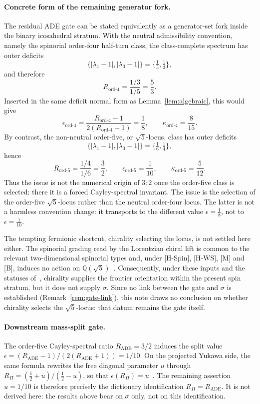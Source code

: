 \documentclass[11pt]{article}
\theoremstyle{definition}
\theoremstyle{remark}
\begin{document}
    \paragraph{Concrete form of the remaining generator fork.}
    The residual ADE gate can be stated equivalently as a generator-set fork inside the binary icosahedral stratum.
    With the neutral admissibility convention, namely the spinorial order-four half-turn class, the class-complete
    spectrum has outer deficits
    \[
      \{|\lambda_1-1|,|\lambda_3-1|\}=\{\tfrac15,\tfrac13\},
    \]
    and therefore
    \[
      R_{\mathrm{ord}\text{-}4}=\frac{1/3}{1/5}=\frac53.
    \]
    Inserted in the same deficit normal form as Lemma~\ref{lem:algebraic}, this would give
    \[
      \epsilon_{\mathrm{ord}\text{-}4}=\frac{R_{\mathrm{ord}\text{-}4}-1}{2(R_{\mathrm{ord}\text{-}4}+1)}=\frac18,
      \qquad
      \kappa_{\mathrm{ord}\text{-}4}=\frac{8}{15}.
    \]
    By contrast, the non-neutral order-five, or $\sqrt{5}$-locus, class has outer deficits
    \[
      \{|\lambda_1-1|,|\lambda_3-1|\}=\{\tfrac16,\tfrac14\},
    \]
    hence
    \[
      R_{\mathrm{ord}\text{-}5}=\frac{1/4}{1/6}=\frac32,
      \qquad
      \epsilon_{\mathrm{ord}\text{-}5}=\frac1{10},
      \qquad
      \kappa_{\mathrm{ord}\text{-}5}=\frac5{12}.
    \]
    Thus the issue is not the numerical origin of $3:2$ once the order-five class is selected: there it is a forced
    Cayley-spectral invariant.
    The issue is the selection of the order-five $\sqrt{5}$-locus rather than the neutral order-four locus.
    The latter is not a harmless convention change: it transports to the different value $\epsilon=\tfrac18$, not to
    $\epsilon=\tfrac1{10}$.

    The tempting fermionic shortcut, chirality selecting the locus, is not settled here either.
    The spinorial grading read by the Lorentzian chiral lift is common to the relevant two-dimensional spinorial types
    and, under [H-Spin], [H-WS], [M] and [B], induces no action on $\mathbb{Q}(\sqrt{5})$~\cite{Beau2026cho}.
    Consequently, under these inputs and the statuses of~\cite{Beau2026cho}, chirality supplies the frontier orientation
    within the present spin stratum, but it does not supply $\sigma$.
    Since no link between the gate and $\sigma$ is established (Remark~\ref{rem:gate-link}), this note draws no conclusion
    on whether chirality selects the $\sqrt{5}$-locus: that datum remains the gate itself.

    \paragraph{Downstream mass-split gate.}
    The order-five Cayley-spectral ratio $R_{\mathrm{ADE}}=3/2$ induces the split value
    $\epsilon=(R_{\mathrm{ADE}}-1)/(2(R_{\mathrm{ADE}}+1))=1/10$.
    On the projected Yukawa side, the same formula rewrites the free diagonal parameter $u$ through
    $R_\Pi=(\tfrac12+u)/(\tfrac12-u)$, so that $\epsilon(R_\Pi)=u$~\cite{Beau2026pyo}.
    The remaining assertion $u=1/10$ is therefore precisely the dictionary identification $R_\Pi=R_{\mathrm{ADE}}$.
    It is not derived here: the results above bear on $\sigma$ only, not on this identification.
\end{document}
